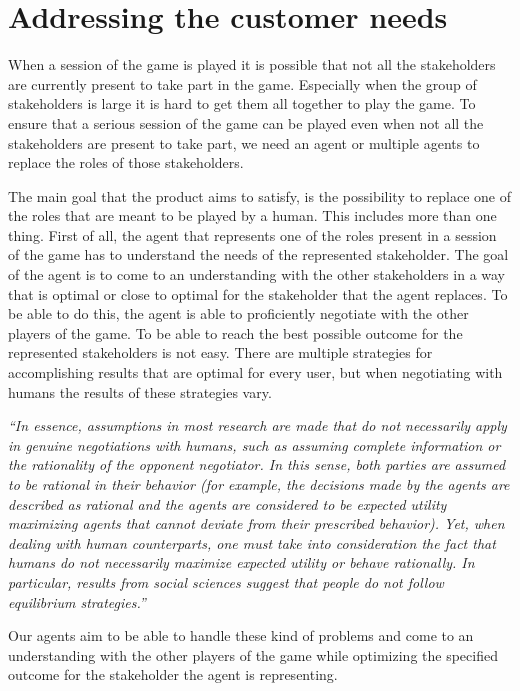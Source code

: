 \section{Addressing the customer needs}
When a session of the game is played it is possible that not all the stakeholders are currently present to take part in the game. Especially when the group of stakeholders is large it is hard to get them all together to play the game. To ensure that a serious session of the game can be played even when not all the stakeholders are present to take part, we need an agent or multiple agents to replace the roles of those stakeholders. 
\par
The main goal that the product aims to satisfy, is the possibility to replace one of the roles that are meant to be played by a human. This includes more than one thing. First of all, the agent that represents one of the roles present in a session of the game has to understand the needs of the represented stakeholder. The goal of the agent is to come to an understanding with the other stakeholders in a way that is optimal or close to optimal for the stakeholder that the agent replaces. To be able to do this, the agent is able to proficiently negotiate with the other players of the game. To be able to reach the best possible outcome for the represented stakeholders is not easy. There are multiple strategies for accomplishing results that are optimal for every user, but when negotiating with humans the results of these strategies vary.

\par
\textit{ “In essence, assumptions in most research are made that do not necessarily apply in genuine negotiations with humans, such as assuming complete information or the rationality of the opponent negotiator. In this sense, both parties are assumed to be rational in their behavior (for example, the decisions made by the agents are described as rational and the agents are considered to be expected utility maximizing agents that cannot deviate from their prescribed behavior). Yet, when dealing with human counterparts, one must take into consideration the fact that humans do not necessarily maximize expected utility or behave rationally. In particular, results from social sciences suggest that people do not follow equilibrium strategies.”}\cite{cacm}

\par
Our agents aim to be able to handle these kind of problems and come to an understanding with the other players of the game while optimizing the specified outcome for the stakeholder the agent is representing.
